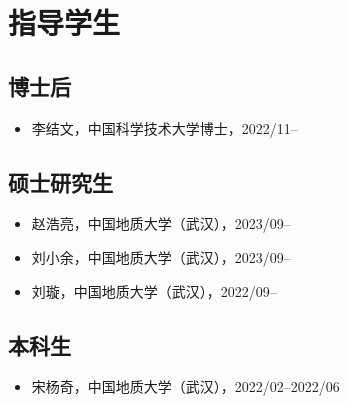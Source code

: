 \section{指导学生}

\subsection{博士后}
\begin{itemize}
\item 李结文，中国科学技术大学博士，2022/11--
\end{itemize}

\subsection{硕士研究生}
\begin{itemize}
\item 赵浩亮，中国地质大学（武汉），2023/09--
\item 刘小余，中国地质大学（武汉），2023/09--
\item 刘璇，中国地质大学（武汉），2022/09--
\end{itemize}

\subsection{本科生}
\begin{itemize}
\item 宋杨奇，中国地质大学（武汉），2022/02--2022/06
\end{itemize}
